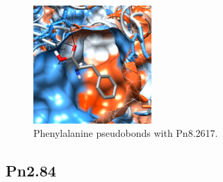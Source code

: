 \documentclass[12pt]{article}
\begin{document}
	\FloatBarrier
	\begin{figure}[H]
		\centering
		\includegraphics[width=0.4\textwidth]{../1/Dock/chimera.png}
		\caption{Phenylalanine pseudobonds with Pn8.2617.}
		\label{fig1_4}
	\end{figure}
	\FloatBarrier
	
	\subsection{Pn2.84}
	
	
	
	
	\newpage
	
	
	
	
	\newpage
	\tableofcontents
	\listoffigures
	\listoftables
	
\end{document}
